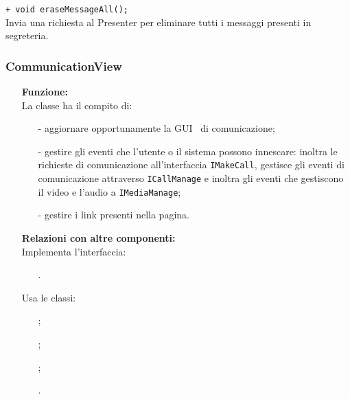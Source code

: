 {\begin{sloppypar}
{{\begin{itemize}
				\texttt{+ void eraseMessageAll();}\\
				Invia una richiesta al Presenter per eliminare tutti i messaggi presenti in segreteria.\\
				
		\end{itemize}
		}

		\subsubsection{CommunicationView}\label{ssub:CommunicationView}{
			\begin{itemize}
				\item[]  \textbf{Funzione:} \\
				La classe ha il compito di:
				\begin{itemize}
					\item[-] aggiornare opportunamente la GUI\g~ di comunicazione;
					\item[-] gestire gli eventi che l'utente o il sistema possono innescare: inoltra 
					le richieste di comunicazione all'interfaccia \texttt{IMakeCall}, gestisce 
					gli eventi di comunicazione attraverso \texttt{ICallManage} e inoltra gli 
					eventi che gestiscono il video e l'audio a \texttt{IMediaManage};
					\item[-] gestire i link presenti nella pagina.\\
				\end{itemize}

				\item[]  \textbf{Relazioni con altre componenti:} \\
				Implementa l'interfaccia:
				\begin{itemize}
					\item[] .
				\end{itemize}

				Usa le classi:
				\begin{itemize}
					\item[] ;
					\item[] ;
					\item[] ;
					\item[] .
				\end{itemize}
			

\end{itemize}}}
\end{sloppypar}}
